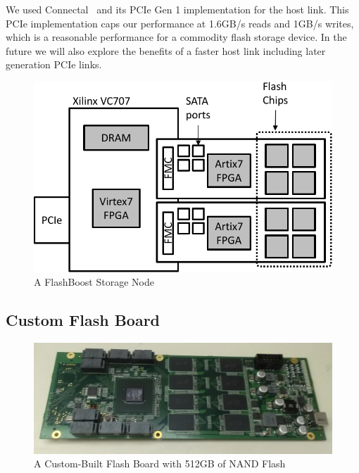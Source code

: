 We used Connectal~\cite{connectal} and its PCIe Gen 1 implementation for the
host link. This PCIe implementation caps our performance at 1.6GB/s reads and
1GB/s writes, which is a reasonable performance for a commodity flash storage
device. In the future we will also explore the benefits of a faster host link
including later generation PCIe links.

\begin{figure}[ht]
	\begin{center}
	\includegraphics[width=0.4\paperwidth]{figures/storagenode-crop.pdf}
	\caption{A FlashBoost Storage Node}
	\label{fig:bluedbmnode}
	\end{center}
\end{figure}


\subsection{Custom Flash Board}

\begin{figure}[ht]
	\begin{center}
	\includegraphics[width=0.4\paperwidth]{figures/flashboard.jpg}
	\caption{A Custom-Built Flash Board with 512GB of NAND Flash}
	\label{fig:flashboard}
	\end{center}
\end{figure}

